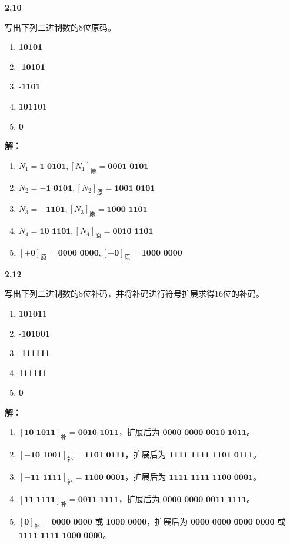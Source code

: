 \documentclass[10pt, a4paper]{article}
\newcommand{\question}[2]{
    \vspace{2ex}\noindent\textbf{#1}\ {\kaishu #2} \par\vspace{1ex}
}
\newcommand{\solution}[1]{
    \noindent\textbf{解：}{\songti #1} \par\vspace{3ex}
}
\begin{document}
\question{2.10}{
写出下列二进制数的8位原码。
\begin{enumerate}
    \item \textbf{10101}
    \item -\textbf{10101}
    \item -\textbf{1101}
    \item \textbf{101101}
    \item \textbf{0}
\end{enumerate}
}

\solution{
\begin{enumerate}
    \item $ N_1 = \textbf{1\ 0101}, [N_1]_\text{原} = \textbf{0001\ 0101} $
    \item $ N_2 = -\textbf{1\ 0101}, [N_2]_\text{原} = \textbf{1001\ 0101} $
    \item $ N_3 = -\textbf{1101}, [N_3]_\text{原} = \textbf{1000\ 1101} $
    \item $ N_4 = \textbf{10\ 1101}, [N_4]_\text{原} = \textbf{0010\ 1101} $
    \item $ [+\textbf{0}]_\text{原} = \textbf{0000\ 0000}, [-\textbf{0}]_\text{原} = \textbf{1000\ 0000} $
\end{enumerate}
}

\question{2.12}{
写出下列二进制数的8位补码，并将补码进行符号扩展求得16位的补码。
\begin{enumerate}
    \item \textbf{101011}
    \item -\textbf{101001}
    \item -\textbf{111111}
    \item \textbf{111111}
    \item \textbf{0}
\end{enumerate}
}

\solution{
\begin{enumerate}
    \item $[\textbf{10\ 1011}]_\text{补} = \textbf{0010\ 1011}$，扩展后为 $\textbf{0000\ 0000\ 0010\ 1011}$。
    \item $[-\textbf{10\ 1001}]_\text{补} = \textbf{1101\ 0111}$，扩展后为 $\textbf{1111\ 1111\ 1101\ 0111}$。
    \item $[-\textbf{11\ 1111}]_\text{补} = \textbf{1100\ 0001}$，扩展后为 $\textbf{1111\ 1111\ 1100\ 0001}$。
    \item $[\textbf{11\ 1111}]_\text{补} = \textbf{0011\ 1111}$，扩展后为 $\textbf{0000\ 0000\ 0011\ 1111}$。
    \item $[\textbf{0}]_\text{补} = \textbf{0000\ 0000}$ 或 $\textbf{1000\ 0000}$，扩展后为 $\textbf{0000\ 0000\ 0000\ 0000}$ 或 $ \textbf{1111\ 1111\ 1000\ 0000}$。
\end{enumerate}
}
\end{document}
